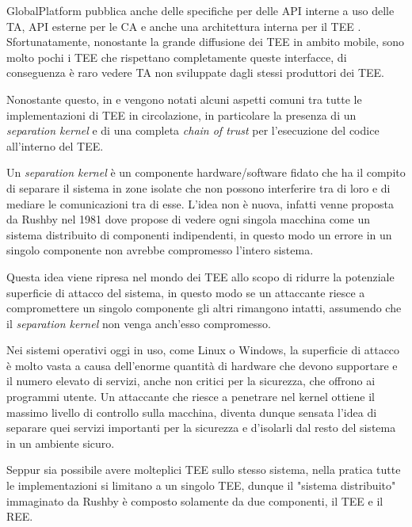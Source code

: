 \documentclass[12pt,italian]{report}
\begin{document}
GlobalPlatform pubblica anche delle specifiche per delle API interne
\cite{gp2020internalapi} a uso delle TA, API esterne per le CA
\cite{gp2020externalapi} e anche una architettura interna per il TEE
\cite{gp2020internalarchitecture}.
Sfortunatamente, nonostante la grande diffusione dei TEE in ambito mobile,
sono molto pochi i TEE che rispettano completamente queste interfacce, di
conseguenza è raro vedere TA non sviluppate dagli stessi produttori dei TEE.

Nonostante questo, in \cite{sabt2015tee} e \cite{???} vengono notati alcuni
aspetti comuni tra tutte le implementazioni di TEE in circolazione,
in particolare la presenza di un \textit{separation kernel} e di una
completa \textit{chain of trust} per l'esecuzione del codice all'interno del
TEE.

Un \textit{separation kernel}\cite{rushby1981separationkernel} è un componente
hardware/software fidato che ha il compito di separare il sistema in zone
isolate che non possono interferire tra di loro e di mediare le comunicazioni
tra di esse.
L'idea non è nuova, infatti venne proposta da Rushby nel 1981 dove propose
di vedere ogni singola macchina come un sistema distribuito di componenti
indipendenti, in questo modo un errore in un singolo componente non avrebbe
compromesso l'intero sistema.

Questa idea viene ripresa nel mondo dei TEE allo scopo di ridurre la
potenziale superficie di attacco del sistema, in questo modo se un
attaccante riesce a compromettere un singolo componente gli altri rimangono
intatti, assumendo che il \textit{separation kernel} non venga anch'esso
compromesso.

Nei sistemi operativi oggi in uso, come Linux o Windows, la superficie di
attacco è molto vasta a causa dell'enorme quantità di hardware che devono
supportare e il numero elevato di servizi, anche non critici per la sicurezza,
che offrono ai programmi utente.
Un attaccante che riesce a penetrare nel kernel ottiene il massimo livello di
controllo sulla macchina, diventa dunque sensata l'idea di separare quei
servizi importanti per la sicurezza e d'isolarli dal resto del sistema in
un ambiente sicuro.

Seppur sia possibile avere molteplici TEE sullo stesso sistema, nella pratica
tutte le implementazioni si limitano a un singolo TEE, dunque il
"sistema distribuito" immaginato da Rushby è composto solamente da due
componenti, il TEE e il REE.
\end{document}
